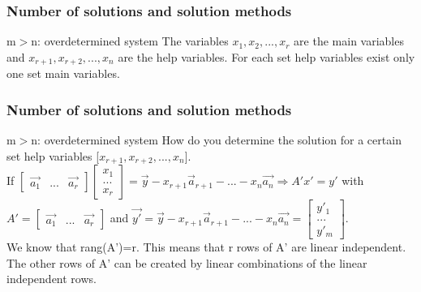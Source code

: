 \begin{frame}
	\frametitle{Number of solutions and solution methods}
	\begin{block}{m$>$n: overdetermined system}
		\vspace{4mm}
		The variables $x_1,x_2,...,x_r$ are the main variables and $x_{r+1},x_{r+2},...,x_n$ are the help variables. For each set help variables exist only one set main variables.\vspace{4mm}
	\end{block}
\end{frame}

\begin{frame}
	\frametitle{Number of solutions and solution methods}
	\begin{block}{m$>$n: overdetermined system}
		How do you determine the solution for a certain set help variables [$x_{r+1},x_{r+2},...,x_n$].\\
		If $\begin{bmatrix} \overrightarrow{a_1} & ... & \overrightarrow{a_r} \end{bmatrix} \begin{bmatrix}
		x_1\\...\\x_r \end{bmatrix}=\overrightarrow{y}-x_{r+1}\overrightarrow{a}_{r+1}-...-x_n\overrightarrow{a_n}
		\Rightarrow A'x'=y'$ with $A'=\begin{bmatrix} \overrightarrow{a_1} & ... & \overrightarrow{a_r} \end{bmatrix}$ and $\overrightarrow{y'}=\overrightarrow{y}-x_{r+1}\overrightarrow{a}_{r+1}-...-x_n\overrightarrow{a_n}=\begin{bmatrix}
		y'_1\\...\\y'_m
		\end{bmatrix}$.\\
		We know that rang(A')=r. This means that r rows of A' are linear independent. The other rows of A' can be created by linear combinations of the linear independent rows. 
	\end{block}
\end{frame}
